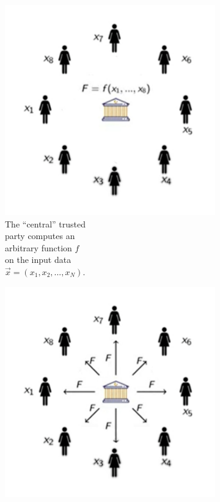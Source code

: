 \documentclass[12pt]{article}
\begin{document}
\begin{figure}[ht]
\begin{subfigure}{.33\textwidth}
            \includegraphics[width=\linewidth]{figures/images/img-2.pdf}
            \caption{The ``central'' trusted\\ \phantom{.....} party computes an\\ arbitrary function $f$\\ on the input data\\  $\vec{x} = ({x}_{1}, {x}_{2}, ..., {x}_{N})$.\\ \phantom{.}}
            \label{fig:secure-multi-party-computation-protocol-step-2}
        \end{subfigure}%
        \begin{subfigure}{.33\textwidth}
            \centering
            \includegraphics[width=\linewidth]{figures/images/img-3.pdf}

\end{subfigure}
\end{figure}
\end{document}
